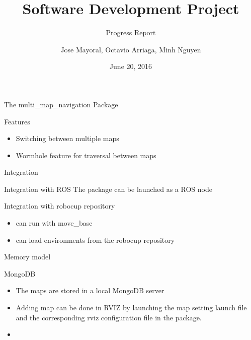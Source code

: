 \documentclass[14pt]{beamer}
\title{Software Development Project}
\subtitle{Progress Report}
\date{June 20, 2016}
\author{Jose Mayoral, Octavio Arriaga, Minh Nguyen}
\begin{document}
\maketitle

\begin{frame}{The multi\_map\_navigation Package}
    \begin{alertblock}{Features}
        \begin{itemize}
            \item Switching between multiple maps
            \item Wormhole feature for traversal between maps
        \end{itemize}
    \end{alertblock}
\end{frame}

\begin{frame}{Integration}
    \begin{alertblock}{Integration with ROS}
        The package can be launched as a ROS node
    \end{alertblock}
    \begin{alertblock}{Integration with robocup repository}
    \begin{itemize}
        \item can run with move\_base
        \item can load environments from the robocup repository
    \end{itemize}
    \end{alertblock}
\end{frame}

\begin{frame}{Memory model}
    \begin{alertblock}{MongoDB}
        \begin{itemize}
            \item The maps are stored in a local MongoDB server
            \item Adding map can be done in RVIZ by launching the map setting launch file and the corresponding rviz configuration file in the package.
            \item 
        \end{itemize}
    \end{alertblock}
\end{frame}

\end{document}
